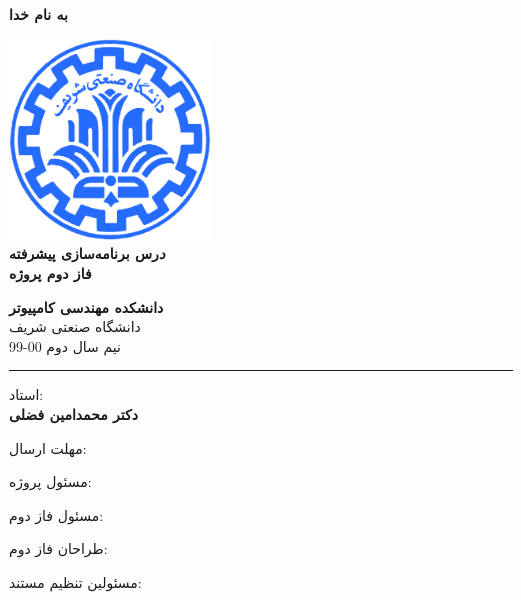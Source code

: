 \documentclass[]{article}
\begin{document}
\begin{titlepage}
\begin{center}

\textbf{ \Huge{به نام خدا} }
        
\vspace{0.2cm}

\includegraphics[width=0.4\textwidth]{sharif1.png}\\
\vspace{0.2cm}
\textbf{ \Huge{\emph درس برنامه‌سازی پیشرفته} }\\
\vspace{0.25cm}
\textbf{ \Large{ فاز دوم پروژه} }
\vspace{0.2cm}
       
 
      \large \textbf{دانشکده مهندسی کامپیوتر}\\\vspace{0.1cm}
    \large   دانشگاه صنعتی شریف\\\vspace{0.2cm}
       \large   ﻧﯿﻢ سال دوم 00-99 \\\vspace{0.10cm}
      \noindent\rule[1ex]{\linewidth}{1pt}
استاد:\\
    \textbf{{دکتر محمدامین فضلی}}



    \vspace{0.20cm}

   مهلت ارسال:\\
    \textbf{{}}
    \textbf{{}}

    \vspace{0.10cm}
مسئول پروژه:\\
    \textbf{\authorFont{}}
    
        \vspace{0.10cm}
مسئول فاز دوم:\\
    \textbf{\authorFont{}}
    
        \vspace{0.10cm}
طراحان فاز دوم:\\
    \textbf{\authorFont{}}
    
        \vspace{0.05cm}
مسئولین تنظیم مستند:\\
    \textbf{\authorFont{}}
    

\end{center}
\end{titlepage}
\end{document}
